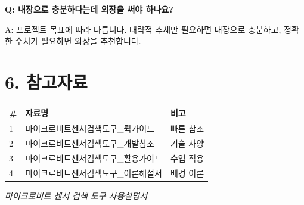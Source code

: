\documentclass[11pt,a4paper]{article}
\begin{document}
\textbf{Q: 내장으로 충분하다는데 외장을 써야 하나요?}


A: 프로젝트 목표에 따라 다릅니다. 대략적 추세만 필요하면 내장으로 충분하고, 정확한 수치가 필요하면 외장을 추천합니다.



\section*{6. 참고자료}

\begin{center}
\renewcommand{\arraystretch}{1.4}
\begin{tabular}{|p{1.5cm}|p{10.6cm}|p{2.9cm}|}
\hline
\rowcolor{tableheader}
\textbf{\#} & \textbf{자료명} & \textbf{비고} \\
\hline
1 & 마이크로비트센서검색도구\_퀵가이드 & 빠른 참조 \\
\hline
2 & 마이크로비트센서검색도구\_개발참조 & 기술 사양 \\
\hline
3 & 마이크로비트센서검색도구\_활용가이드 & 수업 적용 \\
\hline
4 & 마이크로비트센서검색도구\_이론해설서 & 배경 이론 \\
\hline
\end{tabular}
\end{center}


\vfill
\begin{center}
\small\color{lightbrown}
\textit{마이크로비트 센서 검색 도구 사용설명서}
\end{center}
\end{document}
